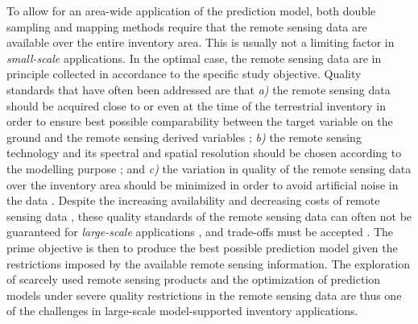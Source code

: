 To allow for an area-wide application of the prediction model, both double sampling and mapping methods require that the remote sensing data are available over the entire inventory area. This is usually not a limiting factor in \textit{small-scale} applications. In the optimal case, the remote sensing data are in principle collected in accordance to the specific study objective. Quality standards that have often been addressed are that \textit{a)} the remote sensing data should be acquired close to or even at the time of the terrestrial inventory in order to ensure best possible comparability between the target variable on the ground and the remote sensing derived variables \citep{mcroberts2015}; \textit{b)} the remote sensing technology and its spectral and spatial resolution should be chosen according to the modelling purpose \citep{kohl2006}; and \textit{c)} the variation in quality of the remote sensing data over the inventory area should be minimized in order to avoid artificial noise in the data \citep{naesset2014inmaltamo}. Despite the increasing availability and decreasing costs of remote sensing data \citep{white2016}, these quality standards of the remote sensing data can often not be guaranteed for \textit{large-scale} applications \citep{maack2016}, and trade-offs must be accepted \citep{jakubowski2013}. The prime objective is then to produce the best possible prediction model given the restrictions imposed by the available remote sensing information. The exploration of scarcely used remote sensing products and the optimization of prediction models under severe quality restrictions in the remote sensing data are thus one of the challenges in large-scale model-supported inventory applications.\par

